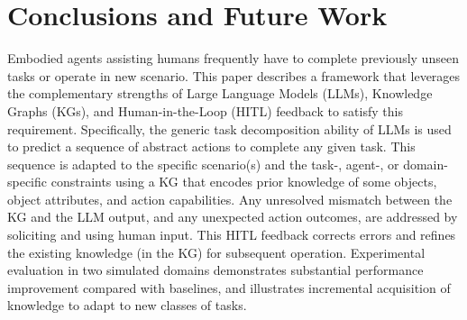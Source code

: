 \section{Conclusions and Future Work}
\label{sec:conclusions}
Embodied agents assisting humans frequently have to complete previously unseen tasks or operate in new scenario. This paper describes a framework that leverages the complementary strengths of Large Language Models (LLMs), Knowledge Graphs (KGs), and Human-in-the-Loop (HITL) feedback to satisfy this requirement. Specifically, the generic task decomposition ability of LLMs is used to predict a sequence of abstract actions to complete any given task. This sequence is adapted to the specific scenario(s) and the task-, agent-, or domain-specific constraints using a KG that encodes prior knowledge of some objects, object attributes, and action capabilities. Any unresolved mismatch between the KG and the LLM output, and any unexpected action outcomes, are addressed by soliciting and using human input. This HITL feedback corrects errors and refines the existing knowledge (in the KG) for subsequent operation. Experimental evaluation in two simulated domains demonstrates substantial performance improvement compared with baselines, and illustrates incremental acquisition of knowledge to adapt to new classes of tasks.


